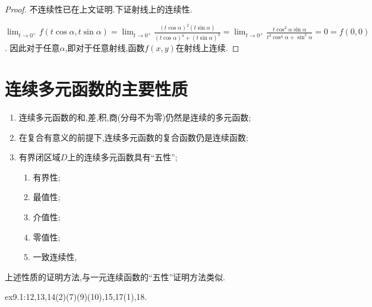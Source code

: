 \begin{proof}
    不连续性已在上文证明.下证射线上的连续性.

    $\lim_{t \to 0^+} f(t \cos \alpha, t \sin \alpha) = \lim_{t \to 0^+} \frac{(t \cos \alpha)^2 (t \sin \alpha)}{(t \cos \alpha)^4 + (t \sin \alpha)^3} = \lim_{t \to 0^+} \frac{t \cos^2 \alpha \sin \alpha}{t^2 \cos^4 \alpha + \sin^2 \alpha} = 0 = f(0,0)$.
    因此对于任意$\alpha$,即对于任意射线,函数$f(x,y)$在射线上连续.
\end{proof}

\section{连续多元函数的主要性质}

\begin{enumerate}
    \item 连续多元函数的和,差,积,商(分母不为零)仍然是连续的多元函数;
    \item 在复合有意义的前提下,连续多元函数的复合函数仍是连续函数;
    \item 有界闭区域$D$上的连续多元函数具有“五性”;
    \begin{enumerate}
        \item 有界性;
        \item 最值性;
        \item 介值性;
        \item 零值性;
        \item 一致连续性,
    \end{enumerate}
\end{enumerate}

上述性质的证明方法,与一元连续函数的“五性”证明方法类似.

\begin{homework}
    ex9.1:12,13,14(2)(7)(9)(10),15,17(1),18.
\end{homework}
